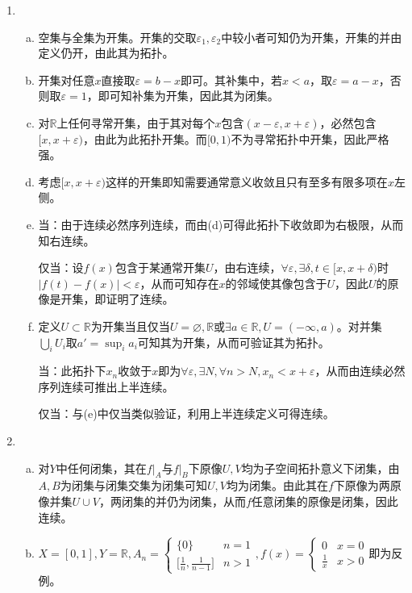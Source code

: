 \documentclass[a4paper,UTF8,fontset=windows]{ctexart}
\begin{document}
\begin{enumerate}[(1)]
    \item
    \begin{enumerate}[(a)]
    \item
    空集与全集为开集。开集的交取$\varepsilon_1,\varepsilon_2$中较小者可知仍为开集，开集的并由定义仍开，由此其为拓扑。
    
    \item
    开集对任意$x$直接取$\varepsilon=b-x$即可。其补集中，若$x<a$，取$\varepsilon=a-x$，否则取$\varepsilon=1$，即可知补集为开集，因此其为闭集。
    
    \item
    对$\mathbb{R}$上任何寻常开集，由于其对每个$x$包含$(x-\varepsilon,x+\varepsilon)$，必然包含$[x,x+\varepsilon)$，由此为此拓扑开集。而$[0,1)$不为寻常拓扑中开集，因此严格强。
    
    \item
    考虑$[x,x+\varepsilon)$这样的开集即知需要通常意义收敛且只有至多有限多项在$x$左侧。
    
    \item
    当：由于连续必然序列连续，而由(d)可得此拓扑下收敛即为右极限，从而知右连续。
    
    仅当：设$f(x)$包含于某通常开集$U$，由右连续，$\forall\varepsilon,\exists\delta,t\in[x,x+\delta)$时$|f(t)-f(x)|<\varepsilon$，从而可知存在$x$的邻域使其像包含于$U$，因此$U$的原像是开集，即证明了连续。
    
    \item
    定义$U\subset\mathbb{R}$为开集当且仅当$U=\varnothing,\mathbb{R}$或$\exists a\in\mathbb{R},U=(-\infty,a)$。对并集$\bigcup_iU_i$取$a'=\sup_ia_i$可知其为开集，从而可验证其为拓扑。
    
    当：此拓扑下$x_n$收敛于$x$即为$\forall\varepsilon,\exists N,\forall n>N,x_n<x+\varepsilon$，从而由连续必然序列连续可推出上半连续。
    
    仅当：与(e)中仅当类似验证，利用上半连续定义可得连续。
    \end{enumerate}
    
    \item
    \begin{enumerate}[(a)]
    \item
    对$Y$中任何闭集，其在$f|_A$与$f|_B$下原像$U,V$均为子空间拓扑意义下闭集，由$A,B$为闭集与闭集交集为闭集可知$U,V$均为闭集。由此其在$f$下原像为两原像并集$U\cup V$，两闭集的并仍为闭集，从而$f$任意闭集的原像是闭集，因此连续。
    
    \item
    $X=[0,1],Y=\mathbb{R},A_n=\begin{cases}\{0\}&n=1\\\big[\frac{1}{n},\frac{1}{n-1}\big]&n>1\end{cases},f(x)=\begin{cases}0&x=0\\\frac{1}{x}&x>0\end{cases}$即为反例。
    

\end{enumerate}
\end{enumerate}
\end{document}
